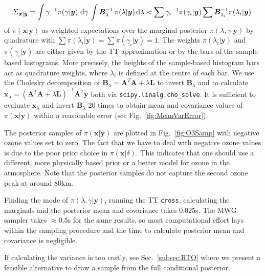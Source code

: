 \begin{align}
	\Sigma_{\bm{x}|\bm{y}} = \int \gamma^{-1}  \pi(\gamma | \bm{y} ) \, \mathop{}\!\mathrm{d} \gamma \, \int  \bm{B}_{\lambda}^{-1} \, \pi(\lambda | \bm{y} )  \, \text{d} \lambda  \approx \sum {\gamma_i}^{-1}\pi(\gamma_i| \bm{y}) \sum \bm{B}_{\lambda_i}^{-1}\pi(\lambda_i| \bm{y})\, \label{eq:CovInt}
\end{align}
of $\pi(\bm{x}| \bm{y})$ as weighted expectations over the marginal posterior $\pi(\lambda,\gamma | \bm{y})$ by quadrature \cite[Sec. 2.1]{Dick_Kuo_Sloan_2013} with $\sum \pi(\lambda_i| \bm{y}) = \sum \pi(\gamma_i| \bm{y}) = 1$.
The weights $\pi(\lambda_i| \bm{y})$ and $\pi(\gamma_i| \bm{y})$ are either given by the TT approximation or by the bars of the sample-based histograms.
More precisely, the heights of the sample-based histogram bars act as quadrature weights, where $\lambda_i$ is defined at the centre of each bar.
We use the Cholesky decomposition of $\bm{B}_{\lambda} = \bm{A}^T \bm{A} + \lambda \bm{L}$ to invert $\bm{B}_{\lambda}$ and to calculate $\bm{x}_{\lambda} = (\bm{A}^T \bm{A} + \lambda \bm{L} )^{-1} \bm{A}^T \bm{y}$ both via \texttt{scipy.linalg.cho\_solve}.
It is sufficient to evaluate $\bm{x}_{\lambda}$ and invert $\bm{B}_{\lambda}$ 20 times to obtain mean and covariance values of $\pi(\bm{x}|\bm{y})$ within a reasonable error (see Fig.~\ref{fig:MeanVarError}).

The posterior samples of $\pi(\bm{x}|\bm{y})$ are plotted in Fig.~\ref{fig:O3Samp} with negative ozone values set to zero.
The fact that we have to deal with negative ozone values is due to the poor prior choice in $\pi(\bm{x}|\delta)$.
This indicates that one should use a different, more physically based prior or a better model for ozone in the atmosphere.
Note that the posterior samples do not capture the second ozone peak at around $80$km.

Finding the mode of $\pi(\lambda,\gamma|\bm{y})$, running the TT \texttt{cross}, calculating the marginals and the posterior mean and covariance takes $0.025$s.
The MWG sampler takes $\approx0.5$s for the same results, so most computational effort lays within the sampling procedure and the time to calculate posterior mean and covariance is negligible.

If calculating the variance is too costly, see Sec.~\ref{subsec:RTO} where we present a feasible alternative to draw a sample from the full conditional posterior.
\clearpage

